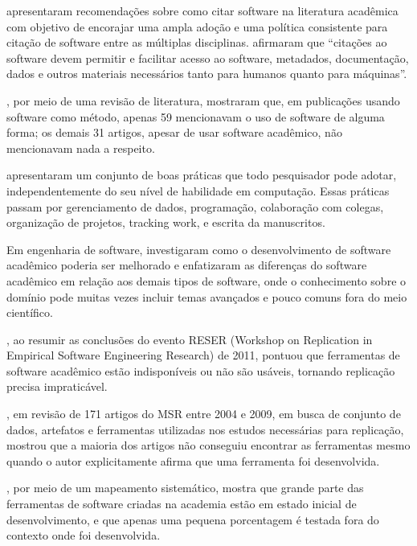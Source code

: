  apresentaram recomendações sobre como citar software
na literatura acadêmica com objetivo de encorajar uma ampla adoção e uma
política consistente para citação de software entre as múltiplas disciplinas.
%
 afirmaram que ``citações ao software devem
permitir e facilitar acesso ao software, metadados, documentação, dados e
outros materiais necessários tanto para humanos quanto para máquinas''.

,
por meio de uma  revisão de literatura, mostraram que,
em  publicações usando software como
método, apenas 59 mencionavam o uso de software de alguma forma;
os demais 31 artigos, apesar de usar software acadêmico, não mencionavam nada a
respeito.

 apresentaram um conjunto de boas práticas que todo
pesquisador pode adotar, independentemente do seu nível de habilidade em
computação. Essas práticas passam por gerenciamento de dados, programação,
colaboração com colegas, organização de projetos, tracking work, e escrita da
manuscritos.



Em engenharia de software, 
investigaram como o desenvolvimento de software acadêmico poderia ser melhorado e
enfatizaram as diferenças do software acadêmico em relação aos demais tipos de
software, onde o conhecimento sobre o domínio pode muitas vezes incluir temas
avançados e pouco comuns fora do meio científico.

,
ao resumir as conclusões do evento RESER (Workshop on Replication in Empirical
Software Engineering Research) de 2011, pontuou que ferramentas de software
acadêmico estão indisponíveis ou não são usáveis, tornando
replicação precisa impraticável.

, em revisão de 171 artigos do MSR entre 2004 e 2009,
em busca de conjunto de dados, artefatos e ferramentas utilizadas nos estudos
necessárias para replicação, mostrou que a maioria dos artigos não conseguiu encontrar
as ferramentas mesmo quando o autor explicitamente afirma que uma ferramenta foi desenvolvida.

, por meio de
um mapeamento sistemático, mostra que grande parte das ferramentas de
software criadas na academia estão em estado inicial de desenvolvimento, e que
apenas uma pequena porcentagem é testada fora do contexto onde foi
desenvolvida. 

